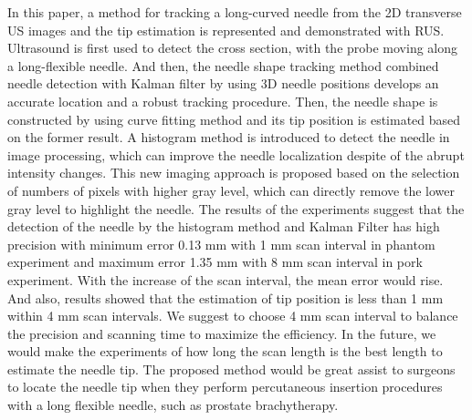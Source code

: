 \documentclass[journal,article,submit,moreauthors,pdftex]{Definitions/mdpi}
\begin{document}
In this paper, a method for tracking a long-curved needle from the 2D transverse US images and the tip estimation is represented and demonstrated with RUS.
Ultrasound is first used to detect the cross section, with the probe moving along a long-flexible needle.
And then, the needle shape tracking method combined needle detection with Kalman filter by using 3D needle positions develops an accurate location and a robust tracking procedure.
Then, the needle shape is constructed by using curve fitting method and its tip position is estimated based on the former result.
A histogram method is introduced to detect the needle in image processing, which can improve the needle localization despite of the abrupt intensity changes.
This new imaging approach is proposed based on the selection of numbers of pixels with higher gray level, which can directly remove the lower gray level to highlight the needle.
The results of the experiments suggest that the detection of the needle by the histogram method and Kalman Filter has high precision with minimum error 0.13 mm with 1 mm scan interval in phantom experiment and maximum error 1.35 mm with 8 mm scan interval in pork experiment.
With the increase of the scan interval, the mean error would rise. And also, results showed that the estimation of tip position is less than 1 mm within 4 mm scan intervals.
We suggest to choose 4 mm scan interval to balance the precision and scanning time to maximize the efficiency.
In the future, we would make the experiments of how long the scan length is the best length to estimate the needle tip. The proposed method would be great assist to surgeons to locate the needle tip when they perform percutaneous insertion procedures with a long flexible needle, such as prostate brachytherapy.

\vspace{6pt}


\end{document}
